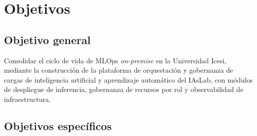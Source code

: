%
%
\chapter{Objetivos}\label{cha:objetivos}

\section{Objetivo general}

Consolidar el ciclo de vida de MLOps \emph{on-premise} en la Universidad Icesi, mediante la construcción de la plataforma de orquestación y gobernanza de cargas de inteligencia artificial y aprendizaje automático del IAsLab, con módulos de despliegue de inferencia, gobernanza de recursos por rol y observabilidad de infraestructura.

\section{Objetivos específicos}\label{sec:objetivos-especificos}

